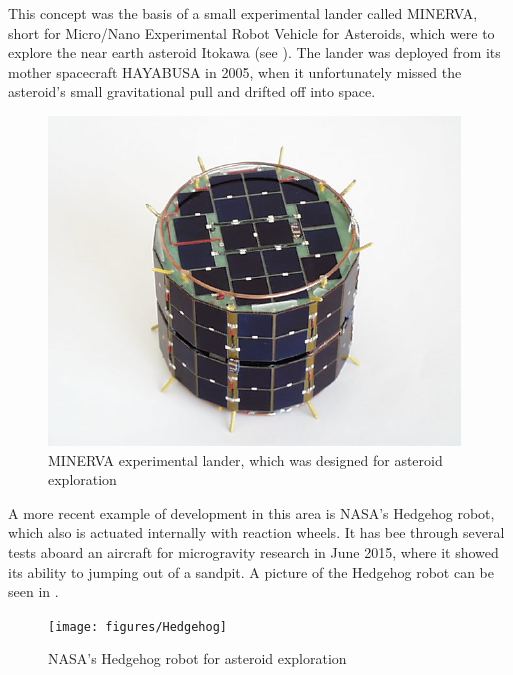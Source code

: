 This concept was the basis of a small experimental lander called MINERVA, short for Micro/Nano Experimental Robot Vehicle for Asteroids, which were to explore the near earth asteroid Itokawa (see ). The lander was deployed from its mother spacecraft HAYABUSA in 2005, when it unfortunately missed the asteroid's small gravitational pull and drifted off into space. \cite{TYoshimitsu}
%
\begin{figure}[H] 
	\centering
	\includegraphics[scale=.8]{figures/MINERVA}
	\caption{MINERVA experimental lander, which was designed for asteroid exploration \cite{TYoshimitsu}}
	\label{MINERVA}
\end{figure}
%
A more recent example of development in this area is NASA's Hedgehog robot, which also is actuated internally with reaction wheels. It has bee through several tests aboard an aircraft for microgravity research in June 2015, where it showed its ability to jumping out of a sandpit. A picture of the Hedgehog robot can be seen in . \cite{ELandau}
%
\begin{figure}[H] 
	\centering
	\texttt{[image: figures/Hedgehog]}
	\caption{NASA's Hedgehog robot for asteroid exploration \cite{ELandau}}
	\label{Hedgehog}
\end{figure}
%
